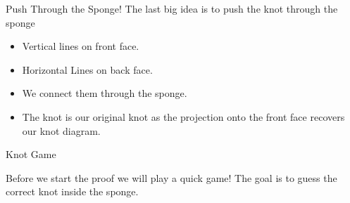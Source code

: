 \begin{frame}[c]{Push Through the Sponge!}
The last big idea is to push the knot through the sponge
\begin{itemize}
    \item Vertical lines on front face.
    \item Horizontal Lines on back face.
    \item We connect them through the sponge.
    \item The knot is our original knot as the projection onto the front face recovers our knot diagram.
\end{itemize}
\end{frame}

\begin{frame}[c]{Knot Game}
	\begin{center}
		Before we start the proof we will play a quick game!
		The goal is to guess the correct knot inside the sponge.
	\end{center}
	
	
\end{frame}